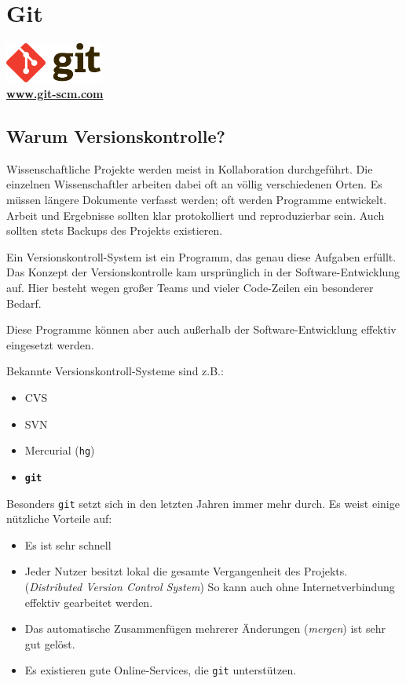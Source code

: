 \chapter{Git}
\begin{center}
    \includegraphics[width=120px]{img/git.pdf} \\
    \textbf{\href{http://git-scm.com}{www.git-scm.com}}
\end{center}

\section{Warum Versionskontrolle?}
Wissenschaftliche Projekte werden meist in Kollaboration durchgeführt.
Die einzelnen Wissenschaftler arbeiten dabei oft an völlig verschiedenen Orten.
Es müssen längere Dokumente verfasst werden; oft werden Programme entwickelt.
Arbeit und Ergebnisse sollten klar protokolliert und reproduzierbar sein.
Auch sollten stets Backups des Projekts existieren.

Ein Versionskontroll-System ist ein Programm, das genau diese Aufgaben erfüllt.
Das Konzept der Versionskontrolle kam ursprünglich in der Software-Entwicklung auf.
Hier besteht wegen großer Teams und vieler Code-Zeilen ein besonderer Bedarf.

Diese Programme können aber auch außerhalb der Software-Entwicklung effektiv eingesetzt werden.

Bekannte Versionskontroll-Systeme sind z.B.:
\begin{itemize}
  \item CVS
  \item SVN
  \item Mercurial (\texttt{hg})
  \item \textbf{\texttt{git}}
\end{itemize}

Besonders \texttt{git} setzt sich in den letzten Jahren immer mehr durch.
Es weist einige nützliche Vorteile auf:
\begin{itemize}
  \item Es ist sehr schnell
  \item Jeder Nutzer besitzt lokal die gesamte Vergangenheit des Projekts. (\textit{Distributed Version Control System})
    So kann auch ohne Internetverbindung effektiv gearbeitet werden.
  \item Das automatische Zusammenfügen mehrerer Änderungen (\textit{mergen}) ist sehr gut gelöst.
  \item Es existieren gute Online-Services, die \texttt{git} unterstützen.
\end{itemize}


